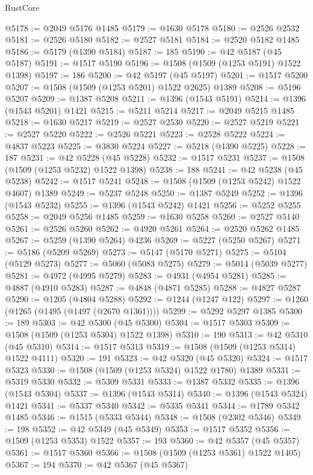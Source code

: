 \begin{lexlean}{RustCore}
\begin{coremodule}
@5178 := @2049 @5176 @1485
@5179 := @1630 @5178
@5180 := @2526 @2532
@5181 := @2526 @5180
@5182 := @2527 @5181
@5184 := @2520 @5182 @1485
@5186 := @5179 (@1390 @5184)
@5187 := 185
@5190 := @42 @5187 (@45 @5187)
@5191 := @1517 @5190
@5196 := @1508 (@1509 (@1253 @5191) @1522 @1398)
@5197 := 186
@5200 := @42 @5197 (@45 @5197)
@5201 := @1517 @5200
@5207 := @1508 (@1509 (@1253 @5201) @1522 @2625) @1389
@5208 := @5196 @5207
@5209 := @1387 @5208
@5211 := @1396 (@1543 @5191)
@5214 := @1396 (@1543 @5201) @1421
@5215 := @5211 @5214
@5217 := @2049 @5215 @1485
@5218 := @1630 @5217
@5219 := @2527 @2530
@5220 := @2527 @5219
@5221 := @2527 @5220
@5222 := @2526 @5221
@5223 := @2528 @5222
@5224 := @4837 @5223
@5225 := @3830 @5224
@5227 := @5218 (@1390 @5225)
@5228 := 187
@5231 := @42 @5228 (@45 @5228)
@5232 := @1517 @5231
@5237 := @1508 (@1509 (@1253 @5232) @1522 @1398)
@5238 := 188
@5241 := @42 @5238 (@45 @5238)
@5242 := @1517 @5241
@5248 := @1508 (@1509 (@1253 @5242) @1522 @4607) @1389
@5249 := @5237 @5248
@5250 := @1387 @5249
@5252 := @1396 (@1543 @5232)
@5255 := @1396 (@1543 @5242) @1421
@5256 := @5252 @5255
@5258 := @2049 @5256 @1485
@5259 := @1630 @5258
@5260 := @2527 @5140
@5261 := @2526 @5260
@5262 := @4920 @5261
@5264 := @2520 @5262 @1485
@5267 := @5259 (@1390 @5264) @4236
@5269 := @5227 (@5250 @5267)
@5271 := @5186 (@5209 @5269)
@5273 := @5147 (@5170 @5271)
@5275 := @5104 (@5129 @5273)
@5277 := @5060 (@5083 @5275)
@5279 := @5014 (@5039 @5277)
@5281 := @4972 (@4995 @5279)
@5283 := @4931 (@4954 @5281)
@5285 := @4887 (@4910 @5283)
@5287 := @4848 (@4871 @5285)
@5288 := @4827 @5287
@5290 := @1205 (@4804 @5288)
@5292 := @1244 (@1247 @122)
@5297 := @1260 (@1265 (@1495 (@1497 (@2670 @1361))))
@5299 := @5292 @5297 @1385
@5300 := 189
@5303 := @42 @5300 (@45 @5300)
@5304 := @1517 @5303
@5309 := @1508 (@1509 (@1253 @5304) @1522 @1398)
@5310 := 190
@5313 := @42 @5310 (@45 @5310)
@5314 := @1517 @5313
@5319 := @1508 (@1509 (@1253 @5314) @1522 @4111)
@5320 := 191
@5323 := @42 @5320 (@45 @5320)
@5324 := @1517 @5323
@5330 := @1508 (@1509 (@1253 @5324) @1522 @1780) @1389
@5331 := @5319 @5330
@5332 := @5309 @5331
@5333 := @1387 @5332
@5335 := @1396 (@1543 @5304)
@5337 := @1396 (@1543 @5314)
@5340 := @1396 (@1543 @5324) @1421
@5341 := @5337 @5340
@5342 := @5335 @5341
@5344 := @1789 @5342 @1485
@5346 := @1515 (@5333 @5344)
@5348 := @1508 (@2302 @5346)
@5349 := 198
@5352 := @42 @5349 (@45 @5349)
@5353 := @1517 @5352
@5356 := @1509 (@1253 @5353) @1522
@5357 := 193
@5360 := @42 @5357 (@45 @5357)
@5361 := @1517 @5360
@5366 := @1508 (@1509 (@1253 @5361) @1522 @1405)
@5367 := 194
@5370 := @42 @5367 (@45 @5367)

\end{coremodule}
\end{lexlean}
